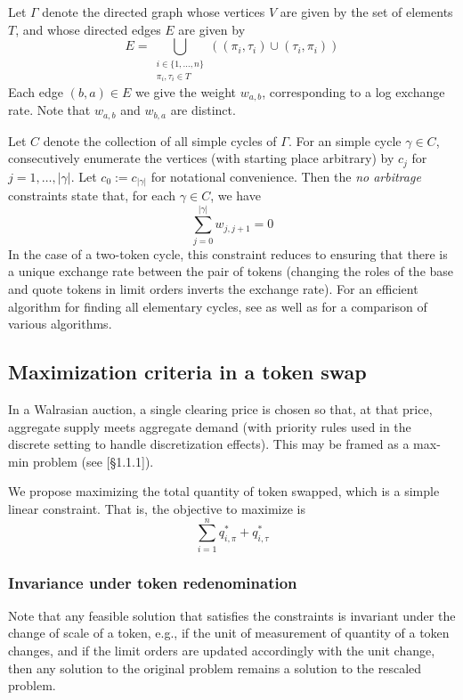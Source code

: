 \documentclass[11pt, reqno]{amsart}
\theoremstyle{definition}
\theoremstyle{remark}
\begin{document}
Let $\Gamma$ denote the directed graph whose vertices $V$ are given by the set
of elements $T$, and whose directed edges $E$ are given by
\[
    E = \bigcup_{\substack{i \in \{1, \ldots, n\} \\ \pi_i, \tau_i \in T}}
    \left( (\pi_i, \tau_i) \cup (\tau_i, \pi_i) \right)
\]
Each edge $(b, a) \in E$ we give the weight $w_{a, b}$, corresponding to a log
exchange rate. Note that $w_{a, b}$ and $w_{b, a}$ are distinct.

Let $C$ denote the collection of all simple cycles of $\Gamma$.
For an simple cycle $\gamma \in C$, consecutively enumerate the vertices
(with starting place arbitrary) by $c_j$ for $j = 1, \ldots, |\gamma|$.
Let $c_0 := c_{|\gamma|}$ for notational convenience. Then
the \emph{no arbitrage} constraints state that, for each $\gamma \in C$, we have
\[
    \sum_{j = 0}^{|\gamma|} w_{j, j + 1} = 0
\]
In the case of a two-token cycle, this constraint reduces to ensuring that
there is a unique exchange rate between the pair of tokens (changing the roles
of the base and quote tokens in limit orders inverts the exchange rate).
For an efficient algorithm for finding all elementary cycles, see \cite{Jo75}
as well as \cite{MaDe76} for a comparison of various algorithms.

\subsection{Maximization criteria in a token swap}

In a Walrasian auction, a single clearing price is chosen so that, at that
price, aggregate supply meets aggregate demand (with priority rules used in
the discrete setting to handle discretization effects). This may be framed
as a max-min problem (see \cite{BoBoDoGo18}[\S 1.1.1]).

We propose maximizing the total quantity of token swapped, which is a simple
linear constraint. That is, the objective to maximize is
\begin{equation}\label{objective_function}
\sum_{i = 1}^n q_{i, \pi}^* + q_{i, \tau}^*
\end{equation}

\subsubsection{Invariance under token redenomination}
Note that any feasible solution that satisfies the constraints is invariant
under the change of scale of a token, e.g., if the unit of measurement of
quantity of a token changes, and if the limit orders are updated accordingly
with the unit change, then any solution to the original problem remains a
solution to the rescaled problem.
\end{document}
